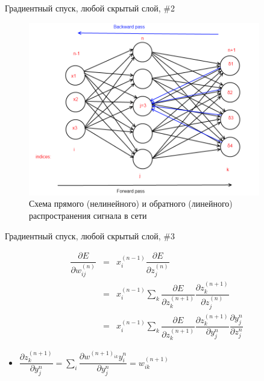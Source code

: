 \documentclass[10pt]{beamer}
\begin{document}
\begin{frame}{Градиентный спуск, любой скрытый слой, \#2}

\begin{figure}[h!]
  \centering
  \includegraphics[width=0.9\textwidth]{images/f_b_pass.png}
  \caption{Схема прямого (нелинейного) и обратного (линейного) распространения сигнала в сети}
\end{figure}

\end{frame}


\begin{frame}[t]{Градиентный спуск, любой скрытый слой, \#3}

\begin{eqnarray*}
	\dfrac{\partial E}{\partial w^{(n)}_{ij}} &=& x^{(n - 1)}_i \dfrac{\partial E}{\partial z^{(n)}_j} \\
	&=& x^{(n - 1)}_i \sum_k \dfrac{\partial E}{\partial z^{(n + 1)}_k} \dfrac{\partial z^{(n + 1)}_k}{\partial z^{(n)}_j} \\
	&=& x^{(n - 1)}_i \sum_k \dfrac{\partial E}{\partial z^{(n + 1)}_k} \dfrac{\partial z^{(n + 1)}_k}{\partial y^{n}_{j}} \dfrac{\partial y^{n}_{j}}{\partial z^{n}_{j}}
\end{eqnarray*}

\begin{itemize}
	\item $\dfrac{\partial z^{(n + 1)}_k}{\partial y^{n}_{j}} = \sum_i \dfrac{\partial w^{(n + 1)_{ik}} y^n_i}{\partial y^n_j} = w^{(n + 1)}_{ik}$
\end{itemize}

\end{frame}
\end{document}
